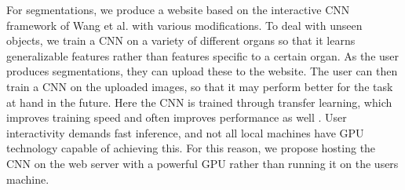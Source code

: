 For segmentations, we produce a website based on the interactive CNN framework of Wang et al. \cite{BIFSeg} with various modifications. To deal with unseen objects, we train a CNN on a variety of different organs so that it learns generalizable features rather than features specific to a certain organ. As the user produces segmentations, they can upload these to the website. The user can then train a CNN on the uploaded images, so that it may perform better for the task at hand in the future. Here the CNN is trained through transfer learning, which improves training speed and often improves performance as well \cite{fineTune}. User interactivity demands fast inference, and not all local machines have GPU technology capable of achieving this. For this reason, we propose hosting the CNN on the web server with a powerful GPU rather than running it on the users machine.  

